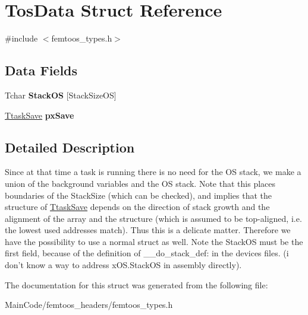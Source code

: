 \hypertarget{struct_tos_data}{\section{Tos\-Data Struct Reference}
\label{struct_tos_data}
}


{\ttfamily \#include $<$femtoos\-\_\-types.\-h$>$}

\subsection*{Data Fields}
\begin{DoxyCompactItemize}
\item 
\hypertarget{struct_tos_data_aade5ec7c2bb4be35987995cd8db781eb}{Tchar {\bfseries Stack\-O\-S} \mbox{[}Stack\-Size\-O\-S\mbox{]}}\label{struct_tos_data_aade5ec7c2bb4be35987995cd8db781eb}

\item 
\hypertarget{struct_tos_data_aa5b6b812366ccca4ded29df0f084f6ed}{\hyperlink{struct_ttask_save}{Ttask\-Save} {\bfseries px\-Save}}\label{struct_tos_data_aa5b6b812366ccca4ded29df0f084f6ed}

\end{DoxyCompactItemize}


\subsection{Detailed Description}
Since at that time a task is running there is no need for the O\-S stack, we make a union of the background variables and the O\-S stack. Note that this places boundaries of the Stack\-Size (which can be checked), and implies that the structure of \hyperlink{struct_ttask_save}{Ttask\-Save} depends on the direction of stack growth and the alignment of the array and the structure (which is assumed to be top-\/aligned, i.\-e. the lowest used addresses match). Thus this is a delicate matter. Therefore we have the possibility to use a normal struct as well. Note the Stack\-O\-S must be the first field, because of the definition of \-\_\-\-\_\-do\-\_\-stack\-\_\-def\-: in the devices files. (i don't know a way to address x\-O\-S.\-Stack\-O\-S in assembly directly). 

The documentation for this struct was generated from the following file\-:\begin{DoxyCompactItemize}
\item 
Main\-Code/femtoos\-\_\-headers/femtoos\-\_\-types.\-h\end{DoxyCompactItemize}
